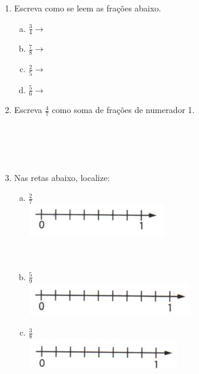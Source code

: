 \documentclass[a4paper,14pt]{article}
\begin{document}
\begin{multicols}{2}
\begin{enumerate}
			\item Escreva como se leem as frações abaixo.
			\begin{enumerate}[a)]
				\item $\frac{3}{4} \longrightarrow$
				\item $\frac{7}{8} \longrightarrow$
				\item $\frac{2}{5} \longrightarrow$
				\item $\frac{5}{6} \longrightarrow$
			\end{enumerate}
			\item Escreva $\frac{4}{7}$ como soma de frações de numerador 1. \\\\\\\\\\
			\item Nas retas abaixo, localize: 
			\begin{enumerate}[a)]
				\item $\frac{2}{7}$ \\
				\includegraphics[width=1\linewidth]{6FMA07_imagens/imagem08} \\\\\\
				\item $\frac{5}{9}$ \\
				\includegraphics[width=1\linewidth]{6FMA07_imagens/imagem09} 
				\item $\frac{3}{8}$ \\
				\includegraphics[width=1\linewidth]{6FMA07_imagens/imagem10} \\\\\\

\end{enumerate}
\end{enumerate}
\end{multicols}
\end{document}
